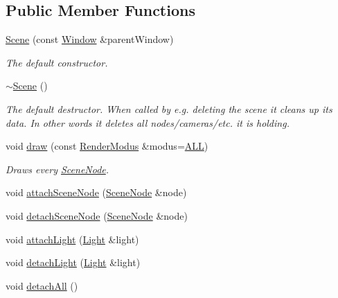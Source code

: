 \subsection*{Public Member Functions}
\begin{DoxyCompactItemize}
\item 
\hyperlink{classburn_1_1_scene_a14bb493f34a5c489f2460b94698c8f72}{Scene} (const \hyperlink{classburn_1_1_window}{Window} \&parent\-Window)
\begin{DoxyCompactList}\small\item\em The default constructor. \end{DoxyCompactList}\item 
\hyperlink{classburn_1_1_scene_a7722cda0111bd22ca193174326e66924}{$\sim$\-Scene} ()
\begin{DoxyCompactList}\small\item\em The default destructor. When called by e.\-g. deleting the scene it cleans up its data. In other words it deletes all nodes/cameras/etc. it is holding. \end{DoxyCompactList}\item 
void \hyperlink{classburn_1_1_scene_aa659a25dafadad6a8ab8e4304cf394a5}{draw} (const \hyperlink{classburn_1_1_scene_a992349a23199d694dca7b8cbd4957299}{Render\-Modus} \&modus=\hyperlink{classburn_1_1_scene_a992349a23199d694dca7b8cbd4957299ae9ec19b90411b53dc2f739816b55a828}{A\-L\-L})
\begin{DoxyCompactList}\small\item\em Draws every \hyperlink{classburn_1_1_scene_node}{Scene\-Node}. \end{DoxyCompactList}\item 
void \hyperlink{classburn_1_1_scene_aa013e68565bda374fa704f816d8e6847}{attach\-Scene\-Node} (\hyperlink{classburn_1_1_scene_node}{Scene\-Node} \&node)
\item 
void \hyperlink{classburn_1_1_scene_a999ba40b417a1074b58c73e837170e51}{detach\-Scene\-Node} (\hyperlink{classburn_1_1_scene_node}{Scene\-Node} \&node)
\item 
void \hyperlink{classburn_1_1_scene_a32378fec20f95d1ed972869e0a4a5b20}{attach\-Light} (\hyperlink{classburn_1_1_light}{Light} \&light)
\item 
void \hyperlink{classburn_1_1_scene_a6e8c366da48a859641a08d82ac4b293d}{detach\-Light} (\hyperlink{classburn_1_1_light}{Light} \&light)
\item 
void \hyperlink{classburn_1_1_scene_a8d4c2bc5288fed85613b59f68e05e96c}{detach\-All} ()
\item 

\end{DoxyCompactItemize}
